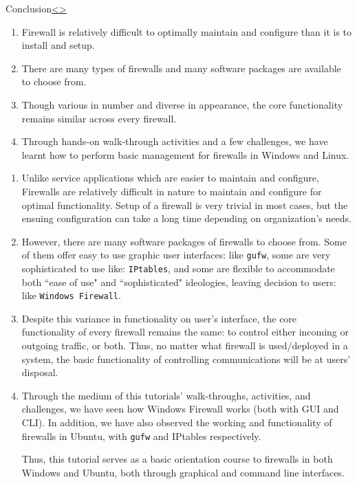 \documentclass[12pt]{extarticle}
\newenvironment{instructionblock}{\Large\bgroup}{\egroup}
\begin{document}


\pagebreak
\begin{slide}{Conclusion}{\hyperref[slide 22]{\textless}\hyperref[slide 24]{\textgreater}}
	\begin{instructionblock}
		\begin{enumerate}
			\item Firewall is relatively difficult to optimally maintain and configure than it is to install and setup.
			\item There are many types of firewalls and many software packages are available to choose from. 
			\item Though various in number and diverse in appearance, the core functionality remains similar across every firewall.
			\item Through hands-on walk-through activities and a few challenges, we have learnt how to perform basic management for firewalls in Windows and Linux.
		\end{enumerate}
	\end{instructionblock}
\end{slide}
\vfill

\begin{enumerate}
\item { Unlike service applications which are easier to maintain and configure, Firewalls are relatively difficult in nature to maintain and configure for optimal functionality. Setup of a firewall is very trivial in most cases, but the ensuing configuration can take a long time depending on organization's needs.}
\item { However, there are many software packages of firewalls to choose from. Some of them offer easy to use graphic user interfaces: like \texttt{gufw}, some are very sophisticated to use like: \texttt{IPtables}, and some are flexible to accommodate both ``ease of use" and ``sophisticated" ideologies, leaving decision to users: like \texttt{Windows Firewall}.   }
\item { Despite this variance in functionality on user's interface, the core functionality of every firewall remains the same: to control either incoming or outgoing traffic, or both. Thus, no matter what firewall is used/deployed in a system, the basic functionality of controlling communications will be at users' disposal. }
\item { Through the medium of this tutorials' walk-throughs, activities, and challenges, we have seen how Windows Firewall works (both with GUI and CLI). In addition, we have also observed the working and functionality of firewalls in Ubuntu, with \texttt{gufw} and IPtables respectively. }

Thus, this tutorial serves as a basic orientation course to firewalls in both Windows and Ubuntu, both through graphical and command line interfaces.

\end{enumerate}
\end{document}
